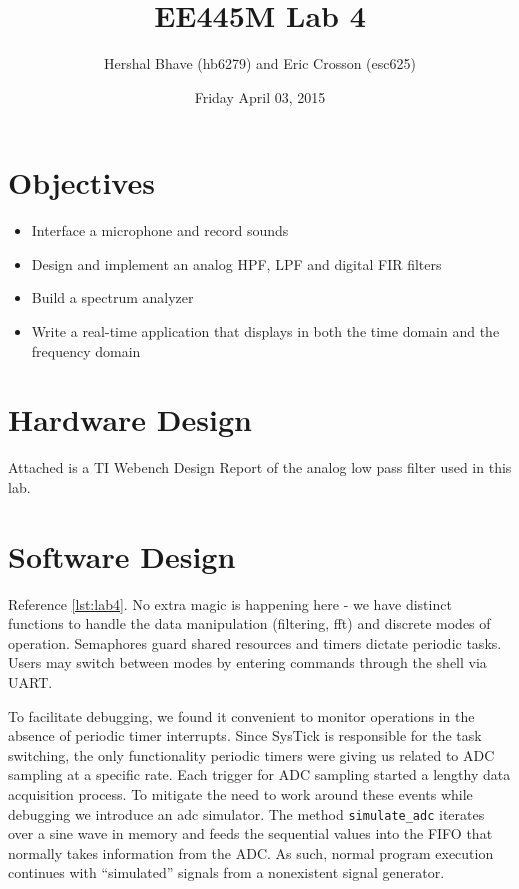 \documentclass[12pt]{article}
\title{EE445M Lab 4}
\author{Hershal Bhave (hb6279) and Eric Crosson (esc625)}
\date{Friday April 03, 2015}
\begin{document}
\maketitle

\section{Objectives}
\begin{itemize}
\item Interface a microphone and record sounds
\item Design and implement an analog HPF, LPF and digital FIR filters
\item Build a spectrum analyzer
\item Write a real-time application that displays in both the time domain and the frequency domain
\end{itemize}

\section{Hardware Design}
Attached is a TI Webench Design Report of the analog low pass filter
used in this lab.


\section{Software Design}
Reference \cref{lst:lab4}. No extra magic is happening here - we have
distinct functions to handle the data manipulation (filtering, fft)
and discrete modes of operation. Semaphores guard shared resources and
timers dictate periodic tasks. Users may switch between
modes by entering commands through the shell via UART.

To facilitate debugging, we found it convenient to monitor operations
in the absence of periodic timer interrupts. Since SysTick is
responsible for the task switching, the only functionality periodic
timers were giving us related to ADC sampling at a specific rate. Each
trigger for ADC sampling started a lengthy data acquisition
process. To mitigate the need to work around these events while
debugging we introduce an adc simulator. The method
\verb|simulate_adc| iterates over a sine wave in memory and feeds the
sequential values into the FIFO that normally takes information from
the ADC. As such, normal program execution continues with
``simulated'' signals from a nonexistent signal generator.
\end{document}
